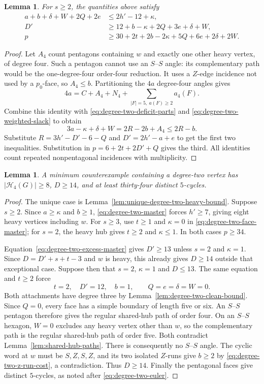 \documentclass[11pt]{article}
\newtheorem{lemma}[theorem]{Lemma}
\theoremstyle{remark}
\numberwithin{equation}{section}
\numberwithin{table}{section}
\begin{document}
\begin{lemma}\label{lem:degree-two-master}
For $s\ge2$, the quantities above satisfy
\begin{align}
 a+b+\delta+W+2Q+2e&\le2h'-12+\kappa,
 \label{eq:degree-two-master}\\
 D'&\ge12+b-\kappa+2Q+3e+\delta+W,
 \label{eq:degree-two-excess-master}\\
 p&\ge30+2t+2b-2\kappa+5Q+6e+2\delta+2W.
 \label{eq:degree-two-face-master}
\end{align}
\end{lemma}
\begin{proof}
Let $A_4$ count pentagons containing $w$ and exactly one other heavy
vertex, of degree four. Such a pentagon cannot use an $S$--$S$ angle:
its complementary path would be the one-degree-four order-four
reduction. It uses a $Z$-edge incidence not used by a $p_0$-face, so
$A_4\le b$. Partitioning the $4a$ degree-four angles gives
\[
 4a=C+A_4+N_4+\sum_{|F|=5,\ a(F)\ge2}a_4(F).
\]
Combine this identity with \eqref{eq:degree-two-deficit-parts} and
\eqref{eq:degree-two-weighted-slack} to obtain
\[
 3a-\kappa+\delta+W=2R-2b+A_4\le2R-b.
\]
Substitute $R=3h'-D'-6-Q$ and $D'=2h'-a+e$ to get the first two
inequalities. Substitution in $p=6+2t+2D'+Q$ gives the third.
All identities count repeated nonpentagonal incidences with
multiplicity.
\end{proof}

\begin{lemma}\label{lem:degree-two-eight-heavy}
A minimum counterexample containing a degree-two vertex has
$|\mathcal H_4(G)|\ge8$, $D\ge14$, and at least thirty-four distinct
$5$-cycles.
\end{lemma}
\begin{proof}
The unique case is Lemma~\ref{lem:unique-degree-two-heavy-bound}.
Suppose $s\ge2$. Since $a\ge\kappa$ and $b\ge1$,
\eqref{eq:degree-two-master} forces $h'\ge7$, giving eight heavy
vertices including $w$. For $s\ge3$, use $t\ge1$ and $\kappa=0$ in
\eqref{eq:degree-two-face-master}; for $s=2$, the heavy hub gives
$t\ge2$ and $\kappa\le1$. In both cases $p\ge34$.

Equation~\eqref{eq:degree-two-excess-master} gives $D'\ge13$
unless $s=2$ and $\kappa=1$. Since $D=D'+s+t-3$ and $w$ is heavy,
this already gives $D\ge14$ outside that exceptional case. Suppose
then that $s=2$, $\kappa=1$ and $D\le13$. The same equation and
$t\ge2$ force
\[
 t=2,\quad D'=12,\quad b=1,\qquad Q=e=\delta=W=0.
\]
Both attachments have degree three by
Lemma~\ref{lem:degree-two-clean-bound}. Since $Q=0$, every face
has a simple boundary of length five or six. An $S$--$S$ pentagon
therefore gives the regular shared-hub path of order four. On an
$S$--$S$ hexagon, $W=0$ excludes any heavy vertex other than $w$,
so the complementary path is the regular shared-hub path of order
five. Both contradict Lemma~\ref{lem:shared-hub-paths}. There is
consequently no $S$--$S$ angle. The cyclic word at $w$ must be
$S,Z,S,Z$, and its two isolated $Z$-runs give $b\ge2$ by
\eqref{eq:degree-two-z-run-cost}, a contradiction. Thus $D\ge14$.
Finally the pentagonal faces give distinct $5$-cycles, as noted
after \eqref{eq:degree-two-euler}.
\end{proof}
\end{document}
